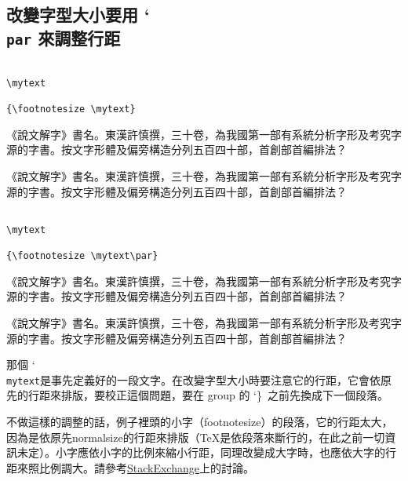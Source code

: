 \subsection{改變字型大小要用 \char`\\\texttt{par} 來調整行距}

\def\mytext{%
《說文解字》書名。東漢許慎撰，三十卷，為我國第一部有系統分析字形及考究字源的字書。按文字形體及偏旁構造分列五百四十部，首創部首編排法？}

\begin{Wrong}
\begin{verbatim}

\mytext

{\footnotesize \mytext}

\end{verbatim}
\mytext

{\footnotesize \mytext}
\end{Wrong}

\begin{Right}
\begin{verbatim}

\mytext

{\footnotesize \mytext\par}

\end{verbatim}
\mytext

{\footnotesize \mytext\par}
\end{Right}
那個 \char`\\\texttt{mytext}是事先定義好的一段文字。在改變字型大小時要注意它的行距，它會依原先的行距來排版，要校正這個問題，要在 group 的 \char`\}\ 之前先換成下一個段落。

不做這樣的調整的話，例子裡頭的小字（footnotesize）的段落，它的行距太大，因為是依原先normalsize的行距來排版（\TeX 是依段落來斷行的，在此之前一切資訊未定）。小字應依小字的比例來縮小行距，同理改變成大字時，也應依大字的行距來照比例調大。請參考\href{https://tex.stackexchange.com/questions/444039/why-do-i-have-to-use-par-if-i-change-font-size-withing-a-group-scope}{\textsf{StackExchange}}上的討論。

\marginpar{\back}
